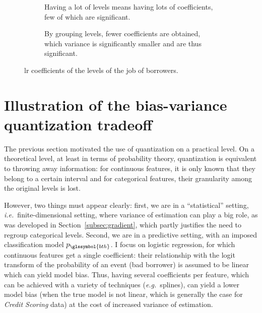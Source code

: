 \begin{figure}[!ht]
\begin{subfigure}[t]{0.5\textwidth}
\centering \resizebox{\textwidth}{!}{}
\caption{Having a lot of levels means having lots of coefficients, few of which are significant.}
\label{fig:csp_estim}
\end{subfigure}
\begin{subfigure}[t]{0.5\textwidth}
\centering \resizebox{\textwidth}{!}{}
\caption{By grouping levels, fewer coefficients are obtained, which variance is significantly smaller and are thus significant.}
\label{fig:csp_estim_disc}
\end{subfigure}
\caption{\gls{lr} coefficients of the levels of the job of borrowers.}
\label{fig:csp}
\end{figure}

\section{Illustration of the bias-variance quantization tradeoff} \label{sec:bias_variance_quant}
 

The previous section motivated the use of quantization on a practical level. On a theoretical level, at least in terms of probability theory, quantization is equivalent to throwing away information: for continuous features, it is only known that they belong to a certain interval and for categorical features, their granularity among the original levels is lost.

However, two things must appear clearly: first, we are in a ``statistical'' setting, \textit{i.e.}\ finite-dimensional setting, where variance of estimation can play a big role, as was developed in Section~\ref{subsec:gradient}, which partly justifies the need to regroup categorical levels. Second, we are in a predictive setting, with an imposed classification model $p_{\glssymbol{bth}}$. I focus on logistic regression, for which continuous features get a single coefficient: their relationship with the logit transform of the probability of an event (bad borrower) is assumed to be linear which can yield model bias. Thus, having several coefficients per feature, which can be achieved with a  variety of techniques (\textit{e.g.}\ splines), can yield a lower model bias (when the true model is not linear, which is generally the case for \textit{Credit Scoring} data) at the cost of increased variance of estimation.

